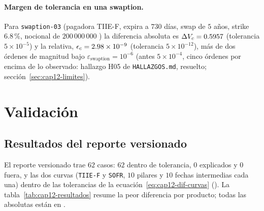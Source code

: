 \paragraph{Margen de tolerancia en una swaption.} Para \texttt{swaption-03} (pagadora TIIE-F, expira a $730$ días, swap de
$5$ años, strike $6.8\,\%$, nocional de $200\,000\,000$ \MXN) la diferencia absoluta es
$\Delta V_c = \verif{cap12-dif-abs-swaption03}{0.5957}$ \MXN (tolerancia $5\times 10^{-5}$) y la relativa,
$\epsilon_c = \verif{cap12-dif-rel-swaption03}{2.98e-9}$ (tolerancia $5\times 10^{-12}$), más de dos órdenes de magnitud bajo
$\varepsilon_{\mathrm{swaption}} = 10^{-6}$ (antes $5\times 10^{-4}$, cinco órdenes por encima de lo observado:
hallazgo H05 de \texttt{HALLAZGOS.md}, resuelto; sección~\ref{sec:cap12-limites}).

\section{Validación}\label{sec:cap12-validacion}

\subsection{Resultados del reporte versionado}

El reporte versionado trae $62$ casos: $62$ dentro de tolerancia, $0$ explicados y $0$ fuera, y las dos curvas
(\texttt{TIIE-F} y \texttt{SOFR}, $10$ pilares y $10$ fechas intermedias cada una) dentro de las tolerancias de la
ecuación~\eqref{eq:cap12-dif-curvas} (). La tabla~\ref{tab:cap12-resultados}
resume la peor diferencia por producto; todas las absolutas están en \MXN.

